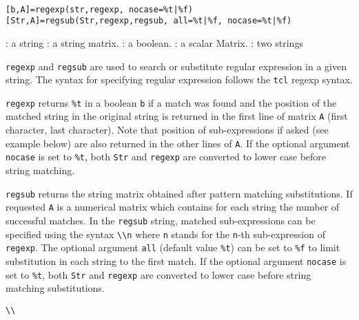 
\begin{mandesc}
   \\
\end{mandesc}
\begin{calling_sequence}
\begin{verbatim}
[b,A]=regexp(str,regexp, nocase=%t|%f)
[Str,A]=regsub(Str,regexp,regsub, all=%t|%f, nocase=%t|%f)
\end{verbatim}
\end{calling_sequence}

\begin{parameters}
  \begin{varlist}
    : a string
    : a string matrix.
    :  a boolean.
    :  a scalar Matrix.
    : two strings
  \end{varlist}
\end{parameters}

\begin{mandescription}
\noindent \verb+regexp+ and \verb+regsub+ are used to search or substitute regular expression
in a given string. The syntax for specifying regular expression follows the \verb+tcl+ 
regexp syntax.

\verb+regexp+ returns \verb+%t+ in a boolean \verb+b+ if a match was found and the 
position of the matched string in the original string is returned in 
the first line of matrix \verb+A+ (first character, last character). 
Note that position of sub-expressions if asked (see example below) 
are also returned in the other lines of \verb+A+. If the optional argument \verb+nocase+ 
is set to \verb+%t+, both \verb+Str+ and \verb+regexp+ are converted to lower case before string matching.

\verb+regsub+ returns the string matrix obtained after pattern matching substitutions. 
If requested \verb+A+ is a numerical matrix which contains for each string the number of successful matches. 
In the \verb+regsub+ string, matched sub-expressions can be specified using the 
syntax \verb+\\n+ where \verb+n+ stands for the \verb+n+-th sub-expression of 
\verb+regexp+. The optional argument \verb+all+ (default value \verb+%t+) can be set to 
\verb+%f+ to limit substitution in each string to the first match. If the optional argument \verb+nocase+ 
is set to \verb+%t+, both \verb+Str+ and \verb+regexp+ are converted to lower case before string matching 
substitutions. 

\end{mandescription}

\begin{examples}
  \begin{program}
    \verb!\\! 
  \end{program}
\end{examples}


